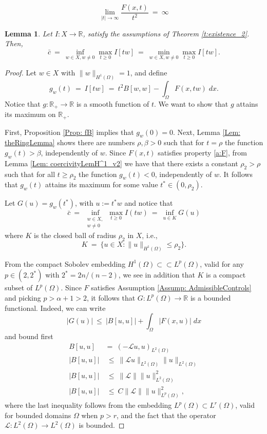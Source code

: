 \documentclass[10pt,a4paper]{amsart}
\newtheorem{lemma}{Lemma}
\def\Om{\Omega}
\def\R{\mathbb{R}}
\begin{document}
\begin{equation}
 \lim_{|t| \to \infty} \frac{F(x,t)}{t^2} \ = \ \infty
 \end{equation}

\begin{lemma}\label{l:min_max}
Let $I: X \longrightarrow \R$, satisfy the assumptions of Theorem \ref{t:existence_2}. Then,
\[ \bar{c} \ = \ \inf_{w \in X, w\neq 0} \max_{t\geq 0} I[tw] \ = \ \min_{w \in X, w\neq 0} \max_{t\geq 0} I[tw].  \]
\end{lemma}

\begin{proof}
Let $w \in X$ with $\|w \|_{H^1(\Omega)} =1$, and define
\[ g_w(t) \ = \ I[tw] \ = \ t^2 B[w,w] - \int_\Omega F(x,tw) \;dx.\]
Notice that $g: \R_+ \to \R$ is a smooth function of $t$. 
We want to show that $g$ attains its maximum on $\R_+$.

First, Proposition \ref{Prop: fB} implies that $g_w(0) =0$. Next, Lemma \ref{Lem: theRingLemma} shows there are numbers $\rho,\beta >0$ such that for $t= \rho$ the function $g_w(t) >\beta$, independently of $w$.
Since $F(x,t)$ satisfies property \ref{a:F}, from Lemma \ref{Lem: coercivityLemH^1_v2} we have that there exists a constant $\rho_2> \rho$ such that for all $t\geq \rho_2$ the function $g_w(t) <0$, independently of $w$. It follows that $g_w(t)$ attains its maximum for some value $t^* \in (0, \rho_2)$.


Let $G(u) = g_w(t^*)$, with $u := t^* w$ and notice that
\[ \bar{c} \ = \ \inf_{\substack{w \in X,\\ w\neq 0}} \max_{t\geq 0} I(tw) \ = \ \inf_{u \in K } G(u)\]
where $K$ is the closed ball of radius $\rho_2$ in $X$, i.e.,
\[ K \ = \ \{ u \in X: \| u\|_{H^1(\Omega)} \leq \rho_2\}.\]


{
From the compact Sobolev embedding $H^1(\Omega) \subset \subset L^p(\Omega)$, valid for any $p \in (2, 2^*)$ with $2^* =  2n/(n-2)$, we see in addition that $K$ is a compact subset of $L^p(\Omega)$. Since $F$ satisfies Assumption \ref{Assump: AdmissibleControls} and picking $ p>\alpha +1>2$, it follows that $G: L^p(\Omega) \longrightarrow \R$ is a bounded functional. Indeed, we can write
\[ |G(u)| \ \leq \ |B[u,u] | +  \int_\Omega \left| F(x,u) \right| \;dx\]
and bound first
\begin{align*}
B[u,u] \ & = \ (- \mathcal{L} u, u)_{L^2(\Omega)} \\
| B[u,u] | & \ \leq \ \|\mathcal{L}u \|_{L^2(\Om)} \| u\|_{L^2(\Omega)} \\
| B[u,u] | & \ \leq \ \|\mathcal{L}\| \|u \|^2_{L^2(\Om)} \\
| B[u,u] | & \ \leq \ C \|\mathcal{L}\| \|u \|^2_{L^p(\Om)},
\end{align*}
where the last inequality follows from the embedding $L^p(\Omega) \subset L^r(\Omega)$, valid for bounded domains $\Omega$ when $p>r$, and the fact that the operator $\mathcal{L}:L^2(\Omega) \longrightarrow L^2(\Omega)$ is bounded.

}
\end{proof}
\end{document}
